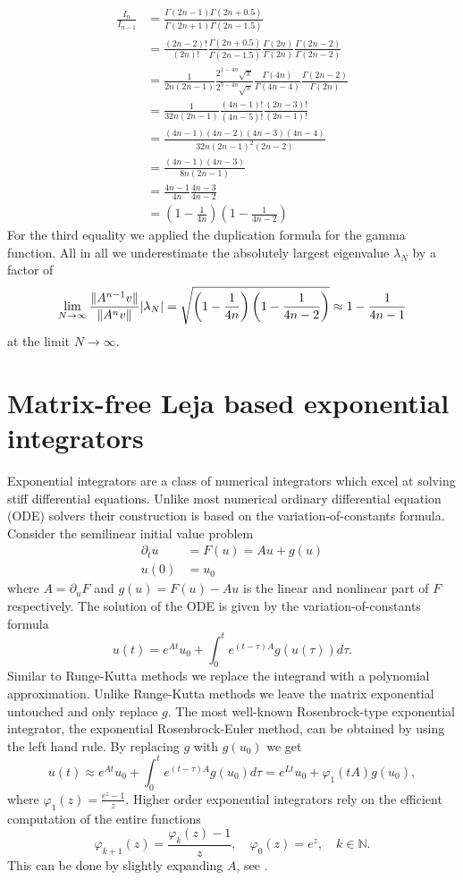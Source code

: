\documentclass{scrartcl}
\begin{document}
\begin{align*}
\frac{I_n}{I_{n-1}} &= 
\frac{\Gamma(2n - 1)\Gamma(2n + 0.5)}{\Gamma(2n + 1)\Gamma(2n - 1.5)} \\&=   
\frac{(2n - 2)!}{(2n)!}
\frac{\Gamma(2n + 0.5)}{\Gamma(2n - 1.5)}
\frac{\Gamma(2n)}{\Gamma(2n)}
\frac{\Gamma(2n-2)}{\Gamma(2n-2)} \\&=
\frac{1}{2n(2n-1)} 
\frac{2^{1-4n}\sqrt\pi}{2^{5-4n}\sqrt\pi}
\frac{\Gamma(4n)}{\Gamma(4n-4)}
\frac{\Gamma(2n-2)}{\Gamma(2n)} \\&=
\frac{1}{32n(2n-1)} 
\frac{(4n-1)!}{(4n-5)!}
\frac{(2n-3)!}{(2n-1)!} \\&=
\frac{(4n-1)(4n-2)(4n-3)(4n-4)}{32n(2n-1)^2(2n-2)} \\&=
\frac{(4n-1)(4n-3)}{8n(2n-1)} \\&=
\frac{4n-1}{4n}\frac{4n-3}{4n-2} \\&=
\left(1-\frac{1}{4n}\right)\left(1-\frac{1}{4n-2}\right)
\end{align*}
For the third equality we applied the duplication formula for the gamma function. All in all we underestimate the absolutely largest eigenvalue $\lambda_N$ by a factor of 
\[
\lim_{N\to\infty}\frac{\lVert A^{n-1}v\rVert}{\lVert A^{n}v\rVert}\lvert\lambda_N\rvert =
\sqrt{\left(1-\frac{1}{4n}\right)\left(1-\frac{1}{4n-2}\right)} \approx
1-\frac{1}{4n-1}
\]
at the limit $N\to\infty$. 

\section{Matrix-free Leja based exponential integrators}
Exponential integrators are a class of numerical integrators which excel at solving stiff differential equations. Unlike most numerical ordinary differential equation (ODE) solvers their construction is based on the variation-of-constants formula. Consider the semilinear initial value problem
\begin{align*}
	\partial_tu &= F(u) = Au + g(u) \\ 
	u(0) &= u_0
\end{align*}
where $A = \partial_uF$ and $g(u) = F(u)-Au$ is the linear and nonlinear part of $F$ respectively. The solution of the ODE is given by the variation-of-constants formula
\[
u(t) = e^{At}u_0 + \int_{0}^{t}e^{(t-\tau)A}g(u(\tau))d\tau.
\]
Similar to Runge-Kutta methods we replace the integrand with a polynomial approximation. Unlike Runge-Kutta methods we leave the matrix exponential untouched and only replace $g$. The most well-known Rosenbrock-type exponential integrator, the exponential Rosenbrock-Euler method, can be obtained by using the left hand rule. By replacing $g$ with $g(u_0)$ we get
\[
u(t) \approx e^{At}u_0 + \int_{0}^{t}e^{(t-\tau)A}g(u_0)d\tau = e^{Lt}u_0 + \varphi_1(tA)g(u_0),
\]
where $\varphi_1(z) = \frac{e^z-1}z$. Higher order exponential integrators rely on the efficient computation of the entire functions 
\[\varphi_{k+1}(z) = \frac{\varphi_k(z)-1}z, \quad \varphi_0(z) = e^z, \quad k\in\mathbb{N}.\]
This can be done by slightly expanding $A$, see \cite[Theorem 2.1]{action}.
\end{document}

